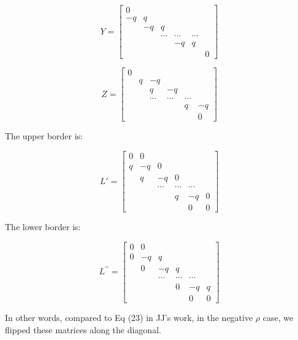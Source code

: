 \documentclass[12pt]{article}
\begin{document}
\begin{itemize}
    \[
    Y = \left[\begin{array}{cccccc}
    0 & & & & & \\
    -q & q & & & & \\
    & -q & q & & & \\
    & & \cdots & \cdots & \cdots & \\
    & & & -q & q & \\
    & & & & & 0
    \end{array}\right]
    \]
    
    \[
    Z = \left[\begin{array}{cccccc}
    0 & & & & & \\
    & q & -q & & & \\
    & & q & -q & & \\
    & & \cdots & \cdots & \cdots & \\
    & & & & q & -q \\
    & & & & & 0
    \end{array}\right]
    \]

    The upper border is:

    \[
    L' = \left[\begin{array}{cccccc}
    0 & 0 & & & & \\
    q & -q & 0 & & & \\
    & q & -q & 0 & & \\
    & & \cdots & \cdots & \cdots & \\
    & & & q & -q & 0 \\
    & & & & 0 & 0
    \end{array}\right]
    \]

    The lower border is:

    \[
    L^{\prime\prime} = \left[\begin{array}{cccccc}
    0 & 0 & & & & \\
    0 & -q & q & & & \\
    & 0 & -q & q & & \\
    & & \cdots & \cdots & \cdots & \\
    & & & 0 & -q & q \\
    & & & & 0 & 0
    \end{array}\right]
    \]
    
    In other words, compared to Eq (23) in JJ's work, in the negative $\rho$ case, we flipped these matrices along the diagonal.
    
\end{itemize}
\vspace{0.5cm}
\end{document}
